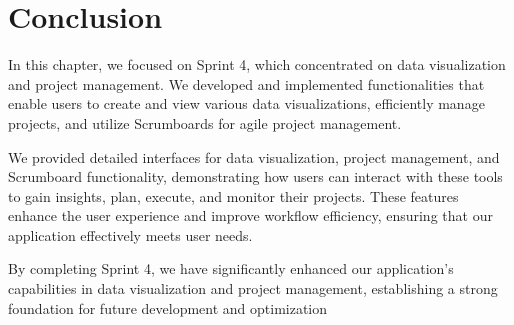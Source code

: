 \section*{Conclusion}
In this chapter, we focused on Sprint 4, which concentrated on data visualization and project management. We developed and implemented functionalities that enable users to create and view various data visualizations, efficiently manage projects, and utilize Scrumboards for agile project management.

We provided detailed interfaces for data visualization, project management, and Scrumboard functionality, demonstrating how users can interact with these tools to gain insights, plan, execute, and monitor their projects. These features enhance the user experience and improve workflow efficiency, ensuring that our application effectively meets user needs.

By completing Sprint 4, we have significantly enhanced our application's capabilities in data visualization and project management, establishing a strong foundation for future development and optimization
